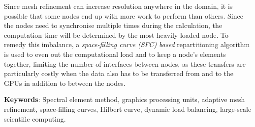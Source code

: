 Since mesh refinement can increase resolution anywhere in the domain, it is possible that some nodes
end up with more work to perform than others. Since the nodes need to synchronise multiple times 
during the calculation, the computation time will be determined by the most heavily loaded node. To 
remedy this imbalance, a \textit{space-filling curve (SFC) based} repartitioning algorithm is used 
to even out the computational load and to keep a node's elements together, limiting the number of 
interfaces between nodes, as these transfers are particularly costly when the data also has to be 
transferred from and to the GPUs in addition to between the nodes.




\textbf{Keywords}: Spectral element method, graphics processing units, adaptive mesh refinement, space-filling curves, Hilbert curve, dynamic load balancing, large-scale scientific computing.

 